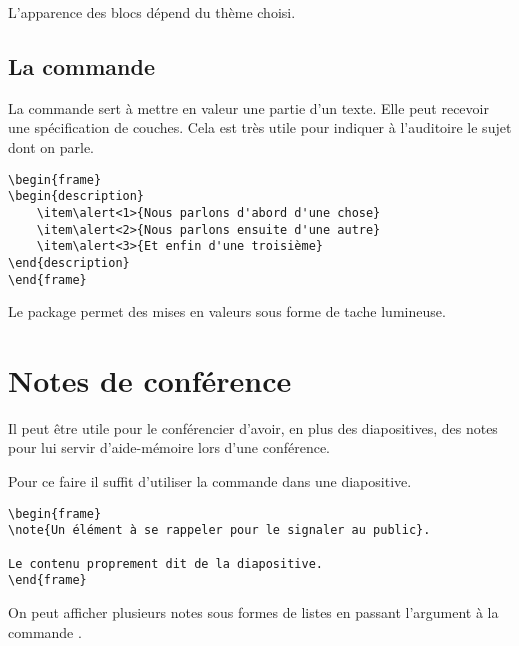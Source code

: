 L'apparence des blocs dépend du thème choisi.

\subsection{La commande }

La commande  sert à mettre en valeur une partie d'un texte. Elle peut recevoir une spécification de couches. Cela est très utile pour indiquer à l'auditoire le sujet dont on parle. 

\begin{verbatim}
\begin{frame}
\begin{description}
	\item\alert<1>{Nous parlons d'abord d'une chose}
	\item\alert<2>{Nous parlons ensuite d'une autre}
	\item\alert<3>{Et enfin d'une troisième}
\end{description}
\end{frame}
\end{verbatim}

\begin{anedocte}

Le package  permet des mises en valeurs sous forme de tache lumineuse.

\end{anedocte}
\section{Notes de conférence}

Il peut être utile pour le conférencier d'avoir, en plus des diapositives, des notes pour lui servir d'aide-mémoire lors d'une conférence.

Pour ce faire il suffit d'utiliser la commande  dans une diapositive.

\begin{verbatim}
\begin{frame}
\note{Un élément à se rappeler pour le signaler au public}.
	
Le contenu proprement dit de la diapositive.
\end{frame}
\end{verbatim}

On peut afficher plusieurs notes sous formes de listes en passant l'argument  à la commande .

